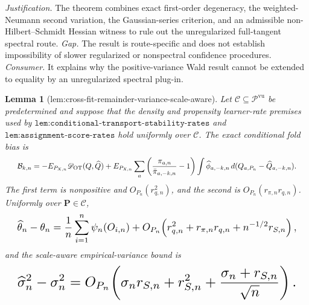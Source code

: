\documentclass{article}
\newtheorem{lemma}{Lemma}
\begin{document}
\par\smallskip\noindent \textit{Justification.} The theorem combines exact first-order degeneracy, the weighted-Neumann second variation, the Gaussian-series criterion, and an admissible non-Hilbert--Schmidt Hessian witness to rule out the unregularized full-tangent spectral route. \textit{Gap.} The result is route-specific and does not establish impossibility of slower regularized or nonspectral confidence procedures. \textit{Consumer.} It explains why the positive-variance Wald result cannot be extended to equality by an unregularized spectral plug-in.

\begin{lemma}[lem:cross-fit-remainder-variance-scale-aware]\label{lem:cross-fit-remainder-variance-scale-aware}
Let \(\mathscr C\subseteq\mathscr P^{\mathrm{vu}}\) be predetermined and suppose that the density and propensity learner-rate premises used by \(\texttt{lem:conditional-transport-stability-rates}\) and \(\texttt{lem:assignment-score-rates}\) hold uniformly over \(\mathscr C\). The exact conditional fold bias is
\[
\makebox[\linewidth][c]{\resizebox{0.98\linewidth}{!}{\par\noindent \makebox[\linewidth][c]{\resizebox{0.98\linewidth}{!}{\(\displaystyle \displaystyle \mathcal B_{k,n}=-E_{P_{X,n}}\mathscr D_{\mathrm{OT}}(Q,\widehat Q)+E_{P_{X,n}}\sum_a\left(\frac{\pi_{a,n}}{\bar\pi_{a,-k,n}}-1\right)\int\widehat\phi_{a,-k,n}\,d(Q_{a,P_n}-\widehat Q_{a,-k,n}).\)}}\par\noindent}}
\]
The first term is nonpositive and \(O_{P_n}(r_{q,n}^2)\), and the second is \(O_{P_n}(r_{\pi,n}r_{q,n})\). Uniformly over \(\mathbf P\in\mathscr C\),
\[
\makebox[\linewidth][c]{\resizebox{0.98\linewidth}{!}{\par\noindent \makebox[\linewidth][c]{\resizebox{0.98\linewidth}{!}{\(\displaystyle \displaystyle \widehat\theta_n-\theta_n=\frac1n\sum_{i=1}^n\psi_n(O_{i,n})+O_{P_n}\!\left(r_{q,n}^2+r_{\pi,n}r_{q,n}+n^{-1/2}r_{S,n}\right),\)}}\par\noindent}}
\]
and the scale-aware empirical-variance bound is
\[
\makebox[\linewidth][c]{\resizebox{0.98\linewidth}{!}{\par\noindent \makebox[\linewidth][c]{\resizebox{0.98\linewidth}{!}{\(\displaystyle \displaystyle \widehat\sigma_n^2-\sigma_n^2=O_{P_n}\!\left(\sigma_n r_{S,n}+r_{S,n}^2+\frac{\sigma_n+r_{S,n}}{\sqrt n}\right).\)}}\par\noindent}}
\]
\end{lemma}
\end{document}
